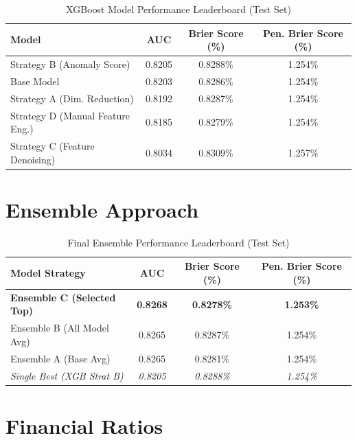 \documentclass{report}\usepackage[]{graphicx}\usepackage[]{xcolor}
\begin{document}
\begin{table}[h]
    \centering
    \caption{XGBoost Model Performance Leaderboard (Test Set)}
    \label{tab:xgb_leaderboard_test}
    \begin{tabular}{lccc}
        \hline
        \textbf{Model} & \textbf{AUC} & \textbf{Brier Score (\%)} & \textbf{Pen. Brier Score (\%)} \\
        \hline
        Strategy B (Anomaly Score) & 0.8205 & 0.8288\% & 1.254\% \\
        Base Model & 0.8203 & 0.8286\% & 1.254\% \\
        Strategy A (Dim. Reduction) & 0.8192 & 0.8287\% & 1.254\% \\
        Strategy D (Manual Feature Eng.) & 0.8185 & 0.8279\% & 1.254\% \\
        Strategy C (Feature Denoising) & 0.8034 & 0.8309\% & 1.257\% \\
        \hline
    \end{tabular}
\end{table}

\section{Ensemble Approach}

\begin{table}[h]
    \centering
    \caption{Final Ensemble Performance Leaderboard (Test Set)}
    \label{tab:final_ensemble_leaderboard}
    \begin{tabular}{lccc}
        \hline
        \textbf{Model Strategy} & \textbf{AUC} & \textbf{Brier Score (\%)} & \textbf{Pen. Brier Score (\%)} \\
        \hline
        \textbf{Ensemble C (Selected Top)} & \textbf{0.8268} & \textbf{0.8278\%} & \textbf{1.253\%} \\
        Ensemble B (All Model Avg) & 0.8265 & 0.8287\% & 1.254\% \\
        Ensemble A (Base Avg) & 0.8265 & 0.8281\% & 1.254\% \\
        \textit{Single Best (XGB Strat B)} & \textit{0.8205} & \textit{0.8288\%} & \textit{1.254\%} \\
        \hline
    \end{tabular}
\end{table}

\section{Financial Ratios}
\end{document}
